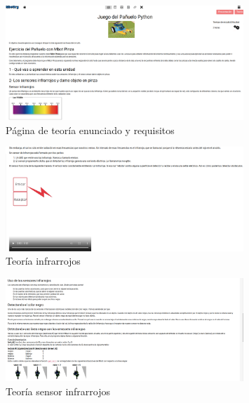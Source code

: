 \begin{figure}[H]
    \centering
    \includegraphics[width=0.8\textwidth, height=0.4\textwidth]{chapters/images/teoriag1.png}
    \caption{Página de teoría enunciado y requisitos}
    \label{fig:my_label}
\end{figure}
\begin{figure}[H]
    \centering
    \includegraphics[width=0.8\textwidth, height=0.4\textwidth]{chapters/images/teoriag2.png}
    \caption{Teoría infrarrojos}
    \label{fig:my_label}
\end{figure}
\begin{figure}[H]
    \centering
    \includegraphics[width=0.8\textwidth, height=0.4\textwidth]{chapters/images/teoriag3.png}
    \caption{Teoría sensor infrarrojos}
    \label{fig:my_label}
\end{figure}

